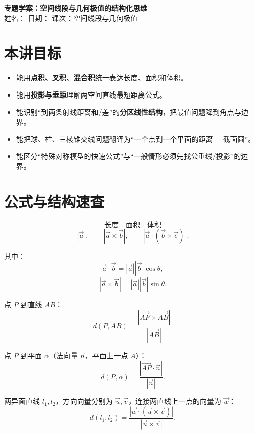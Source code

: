 \documentclass[11pt,a4paper]{ctexart}
\begin{document}
\begin{center}
  {\Large\bfseries 专题学案：空间线段与几何极值的结构化思维}\\[0.4em]
  {\small 姓名：\blank{2.5cm} \quad 日期：\blank{2.5cm} \quad 课次：空间线段与几何极值}
\end{center}
\vspace{0.5em}

\section{本讲目标}

\begin{itemize}[itemsep=0.35em]
  \item 能用\textbf{点积、叉积、混合积}统一表达长度、面积和体积。
  \item 能用\textbf{投影与垂距}理解两空间直线最短距离公式。
  \item 能识别“到两条射线距离和/差”的\textbf{分区线性结构}，把最值问题降到角点与边界。
  \item 能把球、柱、三棱锥交线问题翻译为“一个点到一个平面的距离 + 截面圆”。
  \item 能区分“特殊对称模型的快速公式”与“一般情形必须先找公垂线/投影”的边界。
\end{itemize}

\section{公式与结构速查}

\begin{tcolorbox}[enhanced,colback=gray!5,colframe=black!60,boxrule=0.7pt,arc=1mm,title=\bfseries 1. 向量几何的三层结构]
\[
\boxed{\text{长度}}
\quad
\boxed{\text{面积}}
\quad
\boxed{\text{体积}}
\]
\[
|\vec a|,
\qquad
|\vec a\times\vec b|,
\qquad
|\vec a\cdot(\vec b\times\vec c)|.
\]

其中：
\[
\vec a\cdot\vec b=|\vec a||\vec b|\cos\theta,
\]
\[
|\vec a\times\vec b|=|\vec a||\vec b|\sin\theta.
\]
\end{tcolorbox}

\begin{tcolorbox}[enhanced,colback=gray!5,colframe=black!60,boxrule=0.7pt,arc=1mm,title=\bfseries 2. 点到直线、点到平面、两异面直线]
点 \(P\) 到直线 \(AB\)：
\[
d(P,AB)
=
\frac{|\overrightarrow{AP}\times\overrightarrow{AB}|}{|\overrightarrow{AB}|}.
\]

点 \(P\) 到平面 \(\alpha\)（法向量 \(\vec n\)，平面上一点 \(A\)）：
\[
d(P,\alpha)
=
\frac{|\overrightarrow{AP}\cdot\vec n|}{|\vec n|}.
\]

两异面直线 \(l_1,l_2\)，方向向量分别为 \(\vec u,\vec v\)，连接两直线上一点的向量为 \(\vec w\)：
\[
d(l_1,l_2)
=
\frac{|\vec w\cdot(\vec u\times\vec v)|}{|\vec u\times\vec v|}.
\]
\end{tcolorbox}
\end{document}
